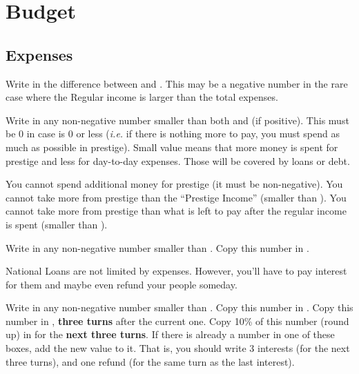 \section{Budget}\label{chBudget:Budget}
\subsection{Expenses}
 Write in  the
difference between  and .
\bparag This may be a negative number in the rare case where the Regular
income is larger than the total expenses.

 Write in  any non-negative
number smaller than both  and
 (if positive).
\bparag This must be 0 in case  is 0 or less
(\emph{i.e.} if there is nothing more to pay, you must spend as much as
possible in prestige).
\bparag Small value means that more money is spent for prestige \VPs and less
for day-to-day expenses. Those will be covered by loans or debt.

\begin{designnote}
  You cannot spend additional money for prestige (it must be non-negative).
  You cannot take more from prestige than the ``Prestige Income'' (smaller
  than ).  You cannot take more from prestige
  than what is left to pay after the regular income is spent (smaller than
  ).
\end{designnote}

 Write in  any non-negative
number smaller than .
\bparag Copy this number in .

\begin{designnote}
  National Loans are not limited by expenses. However, you'll have to pay
  interest for them and maybe even refund your people someday.
\end{designnote}

\label{chBudget:Budget:I. Loans}
 Write in  any
non-negative number smaller than .
\bparag Copy this number in .
\bparag Copy this number in ,
\textbf{three turns} after the current one.
\bparag Copy 10\% of this number (round up) in  for the \textbf{next three turns}. If there is already a
number in one of these boxes, add the new value to it.
\bparag That is, you should write 3 interests (for the next three turns), and
one refund (for the same turn as the last interest).

